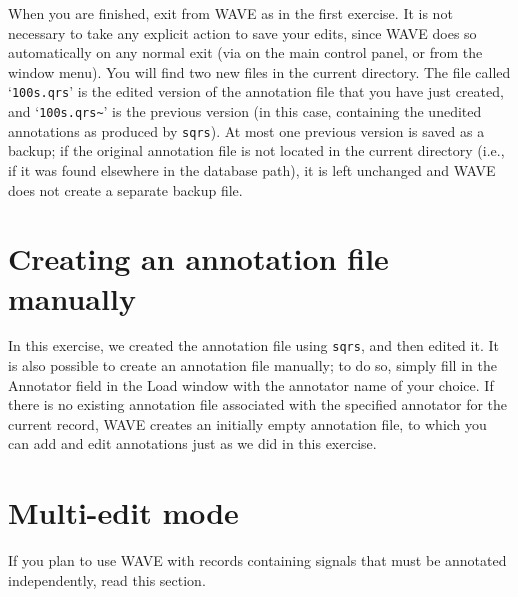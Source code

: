 \documentclass[twoside]{book}
\newcommand{\button}[1]{\cornersize{2}\ovalbox{\rule[-.3mm]{0cm}{2.5mm}\small\sf ~#1~}}
\newcommand{\WAVE}{{\sf WAVE}\xspace}
\begin{document}
When you are finished, exit from \WAVE{} as in the first exercise.  It is
not necessary to take any explicit action to save your edits, since \WAVE{}
does so automatically on any normal exit (via \button{Quit}
on the main control panel,
or from the window menu).  You will find two new files in the
current directory.  The file called `{\tt 100s.qrs}' is the edited version of
the annotation file that you have just created, and `\verb+100s.qrs~+'
is the
previous version (in this case, containing the unedited annotations as produced
by {\tt sqrs}).  At most one previous version is saved as a backup; if the
original annotation file is not located in the current directory (i.e., if it
was found elsewhere in the database path),
it is left unchanged and \WAVE{} does not create a separate backup file.

\section{Creating an annotation file manually}

In this exercise, we created the annotation file using {\tt sqrs}, and then
edited it.  It is also possible to create an annotation file manually;  to
do so, simply fill in the {\sf Annotator} field
in the {\sf Load} window
with the annotator name of your choice.  If there is no existing annotation
file associated with the specified annotator for the current record, \WAVE{}
creates an initially empty annotation file, to which you can add and edit
annotations just as we did in this exercise.

\section{Multi-edit mode}

\label{sec:multi-edit}
\begin{htmlonly}
\end{htmlonly}
\begin{latexonly}
\end{latexonly}
If you plan to use \WAVE{} with records containing signals that must be
annotated independently, read this section.
\end{document}
